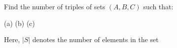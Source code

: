 Find the number of triples of sets $(A, B, C)$ such that:

(a) 
(b) 
(c) 

Here, $|S|$ denotes the number of elements in the set 